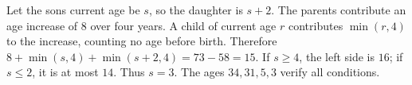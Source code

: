 Let the son\textquotesingle s current age be $s$, so the daughter is $s+2$. The parents contribute an age increase of $8$ over four years. A child of current age $r$ contributes $\min(r,4)$ to the increase, counting no age before birth. Therefore $8+\min(s,4)+\min(s+2,4)=73-58=15$. If $s\ge4$, the left side is $16$; if $s\le2$, it is at most $14$. Thus $\boxed{s=3}$. The ages $34,31,5,3$ verify all conditions.
